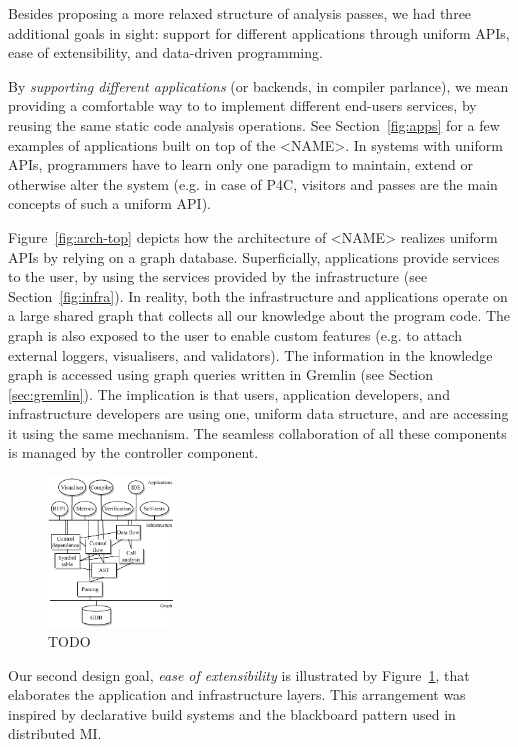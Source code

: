 \documentclass[sigconf]{acmart}
\begin{document}
Besides proposing a more relaxed structure of analysis passes, we had three additional goals in sight: support for different applications through uniform APIs, ease of extensibility, and data-driven programming.

By \textit{supporting different applications} (or backends, in compiler parlance), we mean providing a comfortable way to to implement different end-users services, by reusing the same static code analysis operations.
See Section~\ref{fig:apps} for a few examples of applications built on top of the <NAME>.
In systems with uniform APIs, programmers have to learn only one paradigm to maintain, extend or otherwise alter the system (e.g. in case of P4C, visitors and passes are the main concepts of such a uniform API). 

Figure~\ref{fig:arch-top} depicts how the architecture of <NAME> realizes uniform APIs by relying on a graph database. 
Superficially, applications provide services to the user, by using the services provided by the infrastructure (see Section~\ref{fig:infra}). In reality, both the infrastructure and applications operate on a large shared graph that collects all our knowledge about the program code. The graph is also exposed to the user to enable custom features (e.g. to attach external loggers, visualisers, and validators). The information in the knowledge graph is accessed using graph queries written in Gremlin (see Section \ref{sec:gremlin}). The implication is that users, application developers, and infrastructure developers are using one, uniform data structure, and are accessing it using the same mechanism. The seamless collaboration of all these components is managed by the controller component.

  \begin{figure}
    \includegraphics[width=0.3\textwidth]{figures/arch-deps.pdf}
    \caption{TODO}\label{fig:arch-deps}
  \end{figure}

Our second design goal, \textit{ease of extensibility} is illustrated by Figure~\ref{fig:arch-deps}, that elaborates the application and infrastructure layers. 
This arrangement was inspired by declarative build systems and the blackboard pattern used in distributed MI.
\end{document}
